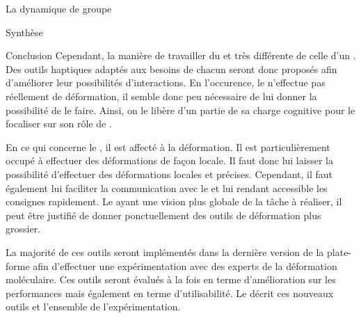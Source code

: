 \documentclass[myfrancais]{mythesis}
\begin{document}
\begin{mychapter}{La dynamique de groupe}
\begin{mysection}{Synthèse}
\begin{mysubsection}{Conclusion}
				Cependant, la manière de travailler du  et très différente de celle d'un .
				Des outils haptiques adaptés aux besoins de chacun seront donc proposés afin d'améliorer leur possibilités d'interactions.
				En l'occurence, le  n'effectue pas réellement de déformation, il semble donc peu nécessaire de lui donner la possibilité de le faire.
				Ainsi, on le libère d'un partie de sa charge cognitive pour le focaliser sur son rôle de .

				En ce qui concerne le , il est affecté à la déformation.
				Il est particulièrement occupé à effectuer des déformations de façon locale.
				Il faut donc lui laisser la possibilité d'effectuer des déformations locales et précises.
				Cependant, il faut également lui faciliter la communication avec le  et lui rendant accessible les consignes rapidement.
				Le  ayant une vision plus globale de la tâche à réaliser, il peut être justifié de donner ponctuellement des outils de déformation plus grossier.

				La majorité de ces outils seront implémentés dans la dernière version de la plate-forme afin d'effectuer une expérimentation avec des experts de la déformation moléculaire.
				Ces outils seront évalués à la fois en terme d'amélioration sur les performances mais également en terme d'utilisabilité.
				Le  décrit ces nouveaux outils et l'ensemble de l'expérimentation.
			\end{mysubsection}
		\end{mysection}
	\end{mychapter}
\end{document}
